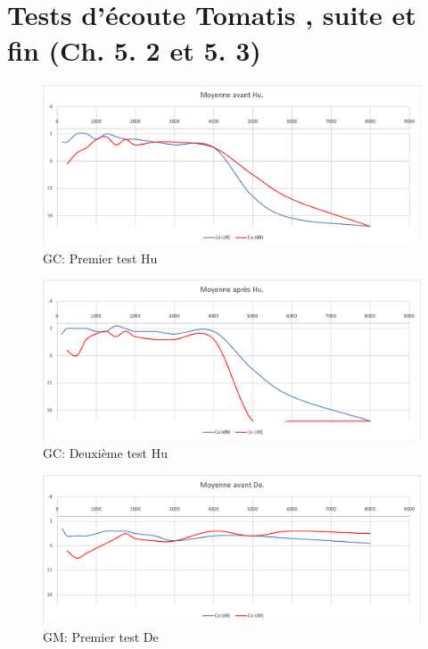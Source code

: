  \section{Tests d'écoute Tomatis \textsuperscript \textregistered , suite et fin (Ch. 5. 2 et 5. 3)}

 \begin{figure}[th]
	\centering
	\includegraphics[width=0.7\linewidth]{images/graphiques/moyavHU}
	\caption[GC: Patient Hu : 1° test]{GC: Premier test Hu}
	\label{fig:moyavhu}
\end{figure}



\begin{figure}[th]
	\centering
	\includegraphics[width=0.7\linewidth]{images/graphiques/moyaprHU}
	\caption[GC: Patient Hu : 2° test]{GC: Deuxième test Hu}
	\label{fig:moyaprhu}
\end{figure}
\begin{figure}[th]
	\centering
	\includegraphics[width=0.7\linewidth]{images/graphiques/moyavDE.png}
	\caption[GM: Patient De : 1° test]{GM: Premier test De}
	\label{fig:moyavde}
\end{figure}


